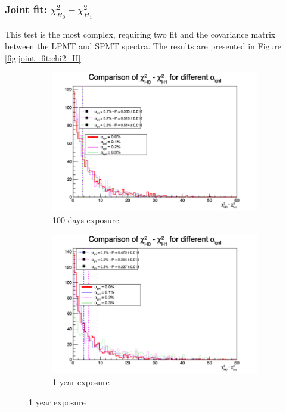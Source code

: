 \documentclass[../main.tex]{subfiles}
\begin{document}
\subsubsection{Joint fit: $\chi^2_{H_0} - \chi^2_{H_1}$}
This test is the most complex, requiring two fit and the covariance matrix between the LPMT and SPMT spectra. The results are presented in Figure \ref{fig:joint_fit:chi2_H}.

\begin{figure}[th]
  \centering
  \begin{subfigure}[t]{0.48\linewidth}
    \includegraphics[width=\linewidth]{images/joint_fit/stat_tests/chi2_H_100d.png}
    \caption{100 days exposure}
  \end{subfigure}
  \begin{subfigure}[t]{0.48\linewidth}
    \includegraphics[width=\linewidth]{images/joint_fit/stat_tests/chi2_H_1y.png}
    \caption{1 year exposure}
  \end{subfigure}



\end{figure}
\end{document}
